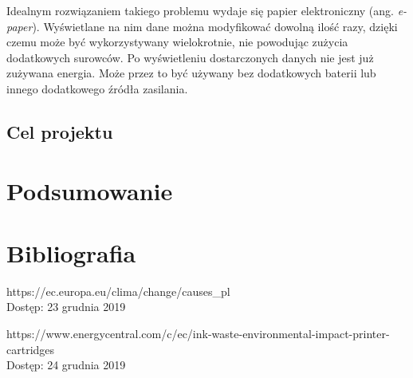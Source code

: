 \documentclass[a4paper,12pt, twoside]{article}
\begin{document}
	Idealnym rozwiązaniem takiego problemu wydaje się papier elektroniczny (ang. \textit{e-paper}). Wyświetlane na nim dane można modyfikować dowolną ilość razy, dzięki czemu może być wykorzystywany wielokrotnie, nie powodując zużycia dodatkowych surowców. Po wyświetleniu dostarczonych danych nie jest już zużywana energia. Może przez to być używany bez dodatkowych baterii lub innego dodatkowego źródła zasilania.
	\newpage
	
	
	\subsection{Cel projektu}
	
	
	
	\section{Podsumowanie}
	
	\newpage
	\section{Bibliografia}
	
	\begingroup
	\renewcommand{\section}[2]{}%
	\begin{thebibliography}{}
		
		https://ec.europa.eu/clima/change/causes\_pl\\
		Dostęp: 23 grudnia 2019
		
		https://www.energycentral.com/c/ec/ink-waste-environmental-impact-printer-cartridges\\
		Dostęp: 24 grudnia 2019
		
		
	\end{thebibliography}
	\endgroup
	
	\newpage
	\section{Spis rysunków}
	\begingroup
	\renewcommand{\section}[2]{}%
	\listoffigures
	\endgroup
	
\end{document}
